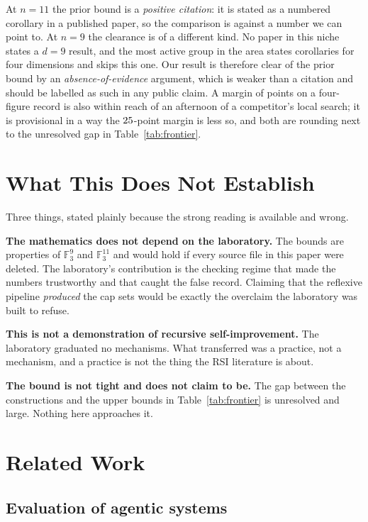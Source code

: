 \documentclass[journal]{IEEEtran}
\begin{document}
At $n=11$ the prior bound is a \emph{positive citation}: it is stated as
a numbered corollary in a published paper, so the comparison is against a
number we can point to. At $n=9$ the clearance is of a different kind. No
paper in this niche states a $d=9$ result, and the most active group in
the area states corollaries for four dimensions and skips this one. Our
result is therefore clear of the prior bound by an
\emph{absence-of-evidence} argument, which is weaker than a citation and
should be labelled as such in any public claim. A margin of
\NumCapNineDelta{} points on a four-figure record is also within reach of
an afternoon of a competitor's local search; it is provisional in a way
the $25$-point margin is less so, and both are rounding
next to the unresolved gap in Table~\ref{tab:frontier}.

\section{What This Does Not Establish}

Three things, stated plainly because the strong reading is available and
wrong.

\textbf{The mathematics does not depend on the laboratory.} The bounds
are properties of $\mathbb{F}_3^9$ and $\mathbb{F}_3^{11}$ and would hold
if every source file in this paper were deleted. The laboratory's
contribution is the checking regime that made the numbers trustworthy and
that caught the false record. Claiming that the reflexive pipeline
\emph{produced} the cap sets would be exactly the overclaim the laboratory
was built to refuse.

\textbf{This is not a demonstration of recursive self-improvement.} The
laboratory graduated no mechanisms. What transferred was a practice, not
a mechanism, and a practice is not the thing the RSI literature is about.

\textbf{The bound is not tight and does not claim to be.} The gap between
the constructions and the upper bounds in Table~\ref{tab:frontier} is
unresolved and large. Nothing here approaches it.

\section{Related Work}

\subsection{Evaluation of agentic systems}
\end{document}
